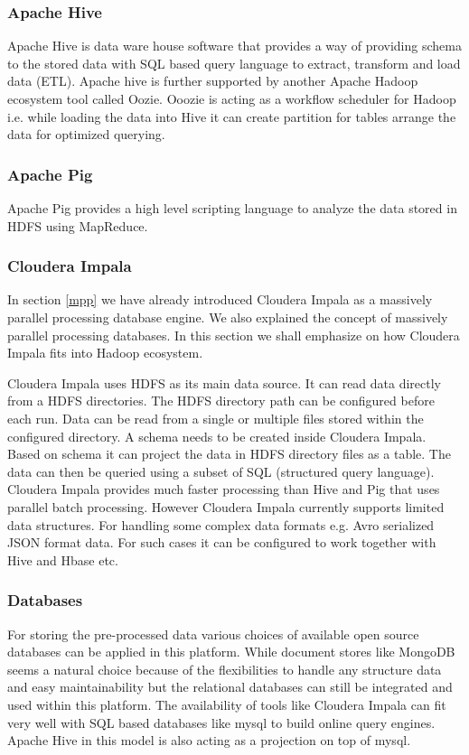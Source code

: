 \subsubsection{Apache Hive}
Apache Hive \cite{hive} is data ware house software that provides a way of providing schema to the stored data with SQL based query language to extract, transform and load data (ETL). Apache hive is further supported by another Apache Hadoop ecosystem tool called Oozie. Ooozie is acting as a workflow scheduler for Hadoop i.e. while loading the data into Hive it can create partition for tables arrange the data for optimized querying.
\subsubsection{Apache Pig}
Apache Pig \cite{pig}  provides a high level scripting language to analyze the data stored in HDFS using MapReduce. 
\subsubsection{Cloudera Impala}
In section \ref{mpp} we have already introduced Cloudera Impala as a massively parallel processing database engine. We also  explained the concept of massively parallel processing databases. In this section we shall emphasize on how Cloudera Impala fits into Hadoop ecosystem.
 
Cloudera Impala uses HDFS as its main data source. It can read data directly from a HDFS directories. The HDFS directory path can be configured before each run. Data can be read from a single or multiple files stored within the configured directory. A schema needs to be created inside Cloudera Impala. Based on schema it can project the data in HDFS directory files as a table. The data can then be queried using a subset of SQL (structured query language). Cloudera Impala provides much faster processing than Hive and Pig that uses parallel batch processing. However Cloudera Impala currently supports limited data structures. For handling some complex data formats e.g. Avro serialized JSON format data. For such cases it can be configured to work together with Hive and Hbase etc.\cite{cimpala} 

\subsubsection{Databases}
For storing the pre-processed data various choices of available open source databases can be applied in this platform. While document stores like MongoDB seems a natural choice because of the flexibilities to handle any structure data and easy maintainability but the relational databases can still be integrated and used within this platform. The availability of tools like Cloudera Impala can fit very well with SQL based databases like mysql to build online query engines. Apache Hive in this model is also acting as a projection on top of mysql.

